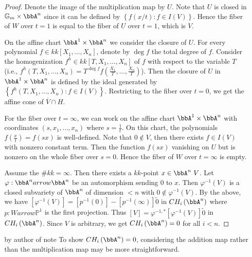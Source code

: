 \begin{proof}
    Denote the image of the multiplication map by $U$. 
    Note that $U$ is closed in $\mathbb{G}_m \times \bbA^n$ since it can be defined by $\left\{f\left(x/t\right) : f \in I\left(V\right)\right\}$. 
    Hence the fiber of $W$ over $t = 1$ is equal to the fiber of $U$ over $t = 1$, which is $V$.

    On the affine chart $\bbA^1 \times \bbA^n$ we consider the closure of $U$. 
    For every polynomial $f \in kk\left[X_1 , \ldots , X_n\right]$, denote by $\deg f$ the total degree of $f$. Consider the homogenization $f^h \in kk\left[T , X_1 , \ldots , X_n\right]$ of $f$ with respect to the variable $T$ (i.e., $f^h \left(T , X_1 , \ldots , X_n\right) = T^{\deg f} f\left(\frac{X_1}{T} , \ldots , \frac{X_n}{T}\right)$). Then the closure of $U$ in $\bbA^1 \times \bbA^n$ is defined by the ideal generated by $\left\{f^h \left(T , X_1 , \ldots , X_n\right) : f \in I\left(V\right)\right\}$. Restricting to the fiber over $t = 0$, we get the affine cone of $\overline{V} \cap H$.

For the fiber over $t = \infty$, we can work on the affine chart $\bbA^1 \times \bbA^n$ with coordinates $\left(s , x_1 , \ldots , x_n\right)$ where $s = \frac{1}{t}$. On this chart, the polynomials $f\left(\frac{x}{t}\right) = f\left(s x\right)$ is well-defined. Note that $0 \notin V$, then there exists $f \in I\left(V\right)$ with nonzero constant term. Then the function $f\left(s x\right)$ vanishing on $U$ but is nonzero on the whole fiber over $s = 0$. Hence the fiber of $W$ over $t = \infty$ is empty.

Assume the $\# kk = \infty$. Then there exists a $kk$-point $x \in \bbA^n \ V$. Let $\varphi :\bbA^n arrow \bbA^n$ be an automorphism sending $0$ to $x$. Then $\varphi^{- 1}\left(V\right)$ is a closed subvariety of $\bbA^n$ of dimension $< n$ with $0 \notin \varphi^{- 1}\left(V\right)$. By the above, we have $\left[\varphi^{- 1}\left(V\right)\right] = \left[p^{- 1}\left(0\right)\right]-\left[p^{- 1}\left(\infty\right)\right] \tilde 0$ in $CH_i \left(\bbA^n\right)$ where $p : W arrow \mathbb{P}^1$ is the first projection. Thus $\left[V\right] = \varphi^{- 1 , *} \left[\varphi^{- 1}\left(V\right)\right] \tilde 0$ in $CH_i \left(\bbA^n\right)$. Since $V$ is arbitrary, we get $CH_i \left(\bbA^n\right) = 0$ for all $i < n$. \end{proof}

\begin{remark}
by author of note To show $CH_i \left(\bbA^n\right) = 0$, considering the addition map rather than the multiplication map may be more straightforward. \end{remark}

